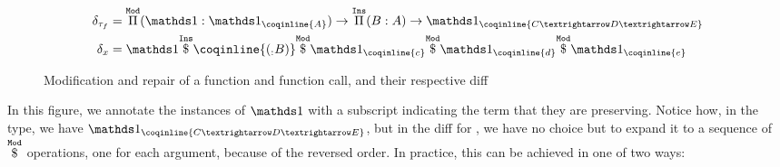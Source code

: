\begin{figure*}[!htp]
\noindent%
\cprotect{}%
\cprotect{}

\vspace{0.2em}%

  \begin{align*}
    \delta_{\tau_{f}} & = \MathModPi{\MathSame{}_{\coqinline{A}}}{\MathSame{}}{\MathInsPi{A}{B}{\MathSame{}_{\coqinline{C → D → E}}}}\\
    \delta_{x} & = \MathModApp{\MathModApp{\MathModApp{\MathInsApp{\MathSame{}}{\coqinline{(_ : B)}}}{\MathSame{}_{\coqinline{c}}}}{\MathSame{}_{\coqinline{d}}}}{\MathSame{}_{\coqinline{e}}}
  \end{align*}

  \caption{Modification and repair of a function and function call, and their respective diff}
  \label{diff-list-vec-nil}

\end{figure*}

In this figure, we annotate the instances of $\MathSame$ with a subscript
indicating the term that they are preserving.  Notice how, in the type, we have
$\MathSame_{\coqinline{C → D → E}}$, but in the diff for , we have
no choice but to expand it to a sequence of $\overset{\mathtt{Mod}}{ \$ }{}$ operations, one
for each argument, because of the reversed order.  In practice, this can be
achieved in one of two ways:

